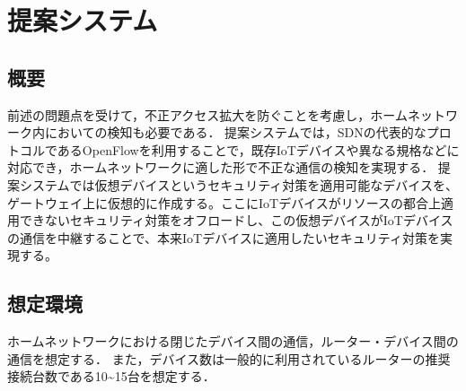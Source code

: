 \documentclass[a4paper,10pt,twocolumn,uplatex]{jsarticle}
\begin{document}



\section{提案システム}
\subsection{概要}
前述の問題点を受けて，不正アクセス拡大を防ぐことを考慮し，ホームネットワーク内においての検知も必要である．
提案システムでは，SDNの代表的なプロトコルであるOpenFlow\cite{OpenFlow}を利用することで，既存IoTデバイスや異なる規格などに対応でき，ホームネットワークに適した形で不正な通信の検知を実現する．
提案システムでは仮想デバイスというセキュリティ対策を適用可能なデバイスを、ゲートウェイ上に仮想的に作成する。ここにIoTデバイスがリソースの都合上適用できないセキュリティ対策をオフロードし、この仮想デバイスがIoTデバイスの通信を中継することで、本来IoTデバイスに適用したいセキュリティ対策を実現する。

\subsection{想定環境}
ホームネットワークにおける閉じたデバイス間の通信，ルーター・デバイス間の通信を想定する．
また，デバイス数は一般的に利用されているルーターの推奨接続台数である10\textasciitilde15台を想定する．
\end{document}
